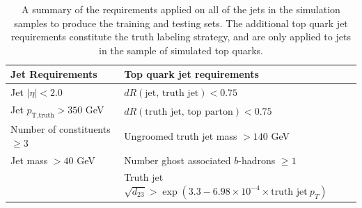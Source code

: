 \begin{table}[]
    \centering
    \begin{tabular}{l|l}
        \hline
        \hline
        Jet Requirements & Top quark jet requirements \\ \hline 
        Jet  $|\eta| < 2.0$ & $dR(\text{jet, truth jet}) < 0.75$ \\
        Jet  $p_{\text{T},\text{truth}} > 350$ GeV & $dR(\text{truth jet, top parton}) < 0.75$ \\
        Number of constituents $\geq 3$ & Ungroomed truth jet mass $> 140$ GeV \\
        Jet mass $> 40$ GeV & Number ghost associated $b$-hadrons $\geq 1$ \\
         & Truth jet $\sqrt{d_{23}} > \exp (3.3 - 6.98 \times 10^{-4} \times \text{truth jet} \: p_T)$ \\ \hline \hline
    \end{tabular}
    \caption{A summary of the requirements applied on all of the jets in the simulation samples to produce the training and testing sets. The additional top quark jet requirements constitute the truth labeling strategy, and are only applied to jets in the sample of simulated top quarks.}
    \label{tab:cuts}
\end{table}
